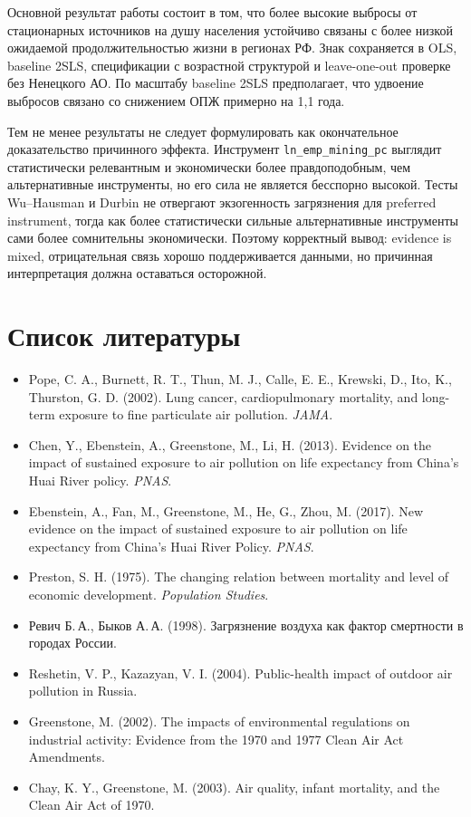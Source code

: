 \documentclass[11pt,a4paper]{article}
\begin{document}
Основной результат работы состоит в том, что более высокие выбросы от стационарных источников на душу населения устойчиво связаны с более низкой ожидаемой продолжительностью жизни в регионах РФ. Знак сохраняется в OLS, baseline 2SLS, спецификации с возрастной структурой и leave-one-out проверке без Ненецкого АО. По масштабу baseline 2SLS предполагает, что удвоение выбросов связано со снижением ОПЖ примерно на 1{,}1 года.

Тем не менее результаты не следует формулировать как окончательное доказательство причинного эффекта. Инструмент \texttt{ln\_emp\_mining\_pc} выглядит статистически релевантным и экономически более правдоподобным, чем альтернативные инструменты, но его сила не является бесспорно высокой. Тесты Wu--Hausman и Durbin не отвергают экзогенность загрязнения для preferred instrument, тогда как более статистически сильные альтернативные инструменты сами более сомнительны экономически. Поэтому корректный вывод: evidence is mixed, отрицательная связь хорошо поддерживается данными, но причинная интерпретация должна оставаться осторожной.

\section*{Список литературы}

\begin{itemize}[label={},leftmargin=0pt,itemsep=4pt]
\item Pope, C. A., Burnett, R. T., Thun, M. J., Calle, E. E., Krewski, D., Ito, K., Thurston, G. D. (2002). Lung cancer, cardiopulmonary mortality, and long-term exposure to fine particulate air pollution. \textit{JAMA}.
\item Chen, Y., Ebenstein, A., Greenstone, M., Li, H. (2013). Evidence on the impact of sustained exposure to air pollution on life expectancy from China's Huai River policy. \textit{PNAS}.
\item Ebenstein, A., Fan, M., Greenstone, M., He, G., Zhou, M. (2017). New evidence on the impact of sustained exposure to air pollution on life expectancy from China's Huai River Policy. \textit{PNAS}.
\item Preston, S. H. (1975). The changing relation between mortality and level of economic development. \textit{Population Studies}.
\item Ревич Б.\,А., Быков А.\,А. (1998). Загрязнение воздуха как фактор смертности в городах России.
\item Reshetin, V. P., Kazazyan, V. I. (2004). Public-health impact of outdoor air pollution in Russia.
\item Greenstone, M. (2002). The impacts of environmental regulations on industrial activity: Evidence from the 1970 and 1977 Clean Air Act Amendments.
\item Chay, K. Y., Greenstone, M. (2003). Air quality, infant mortality, and the Clean Air Act of 1970.
\end{itemize}
\end{document}

